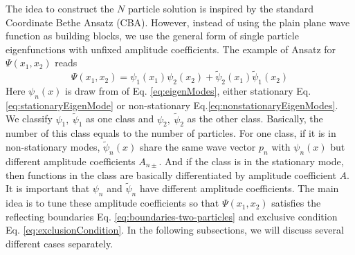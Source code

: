\documentclass[12pt,a4paper]{article}
\begin{document}
The idea to construct the $N$ particle solution is inspired by the standard
Coordinate Bethe Ansatz (CBA). However, instead of using the plain plane wave
function as building blocks, we use the general form of single particle
eigenfunctions with unfixed amplitude coefficients.
The example of Ansatz for $\Psi(x_1, x_2)$ reads
\begin{equation}
    \label{eq:ansatzTwo}
    \Psi(x_1, x_2) = \psi_1(x_1)\psi_2(x_2) + \tilde{\psi}_2(x_1)\tilde{\psi}_1(x_2)
\end{equation}
Here $\psi_n(x)$ is draw from of Eq.
\eqref{eq:eigenModes}, either stationary Eq. \eqref{eq:stationaryEigenMode} or
non-stationary Eq.\eqref{eq:nonstationaryEigenModes}. We classify $\psi_1,
~\tilde{\psi}_1$ as one class and $\psi_2,~\tilde{\psi}_2$ as the other class.
Basically, the number of this class equals to the number of particles.
For one class, if it is in non-stationary modes, 
$\tilde{\psi}_n(x)$ share the same wave vector $p_n$ with $\psi_n(x)$ but
different amplitude coefficients $A_{n\pm}$. And if the class is in the
stationary mode, then functions in the class are basically differentiated by
amplitude coefficient $A$. It is important that $\psi_n$ and $\tilde{\psi}_n$
have different amplitude coefficients. The main idea is to tune these
amplitude coefficients so that $\Psi(x_1, x_2)$ satisfies the reflecting
boundaries Eq. \eqref{eq:boundaries-two-particles} and exclusive condition Eq.
\eqref{eq:exclusionCondition}.  
In the following subsections, we will discuss several different cases
separately.  
\end{document}
